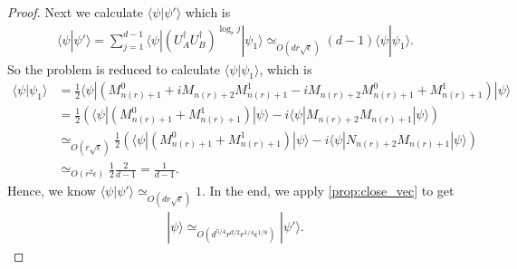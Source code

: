 \documentclass[11pt,letterpaper]{article}
\newcommand{\ket}[1]{|#1\rangle}
\newcommand{\bra}[1]{\langle#1|}
\newcommand{\braket}[2]{\langle#1|#2\rangle}
\newcommand{\ct}{^{\dagger}}
\DeclarePairedDelimiter{\norm}{\lVert}{\rVert}
\newcommand{\1}{\mathbb{1}}
\newcommand{\nr}{n(r)}
\newcommand{\ep}{\epsilon}
\newcommand{\se}{\sqrt{\epsilon}}
\newcommand{\qe}{\epsilon^{1/4}}
\newcommand{\appd}[1]{\simeq_{#1}}
\newtheorem{proposition}[theorem]{Proposition}
\theoremstyle{definition}
\begin{document}
\begin{proof}
	Next we calculate $\braket{\psi}{\psi'}$ which is
	\begin{align}
		\braket{\psi}{\psi'} = \sum_{j=1}^{d-1} \bra{\psi} (U_A\ct U_B\ct)^{\log_r j} \ket{\psi_1}
		 \appd{O(dr\se)} (d-1) \braket{\psi}{\psi_1}.
	\end{align}
	So the problem is reduced to calculate $\braket{\psi}{\psi_1}$, which is
	\begin{align}
		\braket{\psi}{\psi_1} &= \frac{1}{2} \bra{\psi} (M_{\nr+1}^0 + iM_{\nr+2}M_{\nr+1}^1 - iM_{\nr+2}M_{\nr+1}^0 +M_{\nr+1}^1) \ket{\psi}\\
		& = \frac{1}{2} \left(\bra{\psi}(M_{\nr+1}^0 + M_{\nr+1}^1) \ket{\psi} - i \bra{\psi}M_{\nr+2}M_{\nr+1} \ket{\psi} \right)\\
		& \appd{O(r\se)} \frac{1}{2} \left(\bra{\psi}(M_{\nr+1}^0 + M_{\nr+1}^1) \ket{\psi}  - i \bra{\psi}N_{\nr+2}M_{\nr+1} \ket{\psi} \right)\\
		& \appd{O(r^2 \ep)} \frac{1}{2} \frac{2}{d-1} = \frac{1}{d-1}.
	\end{align}
	Hence, we know $\braket{\psi}{\psi'} \appd{O(d r \se)} 1$.
	In the end, we apply \cref{prop:close_vec} to get
	\begin{align}
		\ket{\psi} \appd{O(d^{5/4} r^{d/2} r^{1/4} \ep^{1/8})} \ket{\psi'}.
	\end{align}
\end{proof}
\end{document}
